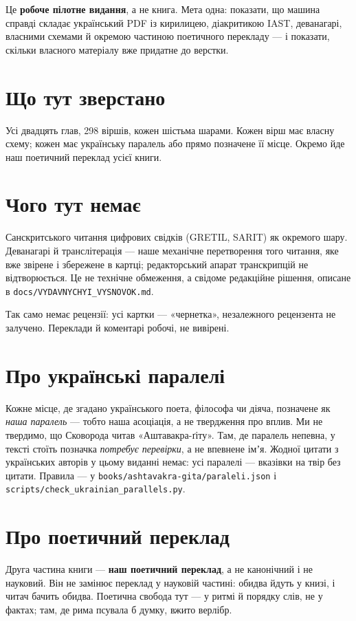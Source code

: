 \documentclass[10pt,a5paper,openany]{book}
\begin{document}
Це \textbf{робоче пілотне видання}, а не книга. Мета одна: показати, що
машина справді складає український PDF із кирилицею, діакритикою IAST,
деванагарі, власними схемами й окремою частиною поетичного перекладу — і
показати, скільки власного матеріалу вже придатне до верстки.

\section*{Що тут зверстано}

Усі двадцять глав, 298 віршів, кожен шістьма шарами. Кожен вірш має власну
схему; кожен має українську паралель або прямо позначене її місце. Окремо
йде наш поетичний переклад усієї книги.

\section*{Чого тут немає}

Санскритського читання цифрових свідків (GRETIL, SARIT) як окремого шару.
Деванагарі й транслітерація — наше механічне перетворення того читання, яке
вже звірене і збережене в картці; редакторський апарат транскрипцій не
відтворюється. Це не технічне обмеження, а свідоме редакційне рішення,
описане в \texttt{docs/VYDAVNYCHYI\_VYSNOVOK.md}.

Так само немає рецензії: усі картки — «чернетка», незалежного рецензента не
залучено. Переклади й коментарі робочі, не вивірені.

\section*{Про українські паралелі}

Кожне місце, де згадано українського поета, філософа чи діяча, позначене як
\emph{наша паралель} — тобто наша асоціація, а не твердження про вплив.
Ми не твердимо, що Сковорода читав «Аштавакра-ґіту». Там, де паралель
непевна, у тексті стоїть позначка \textit{потребує перевірки}, а не впевнене
імʼя. Жодної цитати з українських авторів у цьому виданні немає: усі
паралелі — вказівки на твір без цитати. Правила — у
\texttt{books/ashtavakra-gita/paraleli.json} і \texttt{scripts/check\_ukrainian\_parallels.py}.

\section*{Про поетичний переклад}

Друга частина книги — \textbf{наш поетичний переклад}, а не канонічний і не
науковий. Він не замінює переклад у науковій частині: обидва йдуть у книзі,
і читач бачить обидва. Поетична свобода тут — у ритмі й порядку слів, не у
фактах; там, де рима псувала б думку, вжито верлібр.
\end{document}
